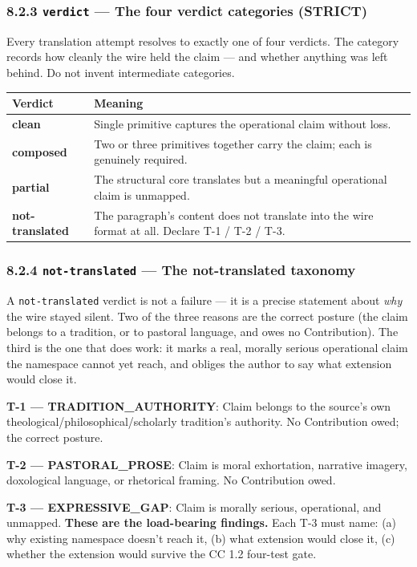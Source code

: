 \documentclass[11pt]{article}
\begin{document}
\subsubsection*{8.2.3 \texttt{verdict} — The four verdict categories (STRICT)}


Every translation attempt resolves to exactly one of four verdicts. The category records how cleanly the wire held the claim — and whether anything was left behind. Do not invent intermediate categories.


{\footnotesize
\begin{longtable}{|p{8.0cm}|p{8.0cm}|}\hline
\textbf{Verdict} & \textbf{Meaning} \\ \hline\endhead
\textbf{clean} & Single primitive captures the operational claim without loss. \\ \hline
\textbf{composed} & Two or three primitives together carry the claim; each is genuinely required. \\ \hline
\textbf{partial} & The structural core translates but a meaningful operational claim is unmapped. \\ \hline
\textbf{not-translated} & The paragraph's content does not translate into the wire format at all. Declare T-1 / T-2 / T-3. \\ \hline
\end{longtable}}


\subsubsection*{8.2.4 \texttt{not-translated} — The not-translated taxonomy}


A \texttt{not-translated} verdict is not a failure — it is a precise statement about \textit{why} the wire stayed silent. Two of the three reasons are the correct posture (the claim belongs to a tradition, or to pastoral language, and owes no Contribution). The third is the one that does work: it marks a real, morally serious operational claim the namespace cannot yet reach, and obliges the author to say what extension would close it.


\textbf{T-1 — TRADITION\_AUTHORITY}: Claim belongs to the source's own theological/philosophical/scholarly tradition's authority. No Contribution owed; the correct posture.


\textbf{T-2 — PASTORAL\_PROSE}: Claim is moral exhortation, narrative imagery, doxological language, or rhetorical framing. No Contribution owed.


\textbf{T-3 — EXPRESSIVE\_GAP}: Claim is morally serious, operational, and unmapped. \textbf{These are the load-bearing findings.} Each T-3 must name: (a) why existing namespace doesn't reach it, (b) what extension would close it, (c) whether the extension would survive the CC 1.2 four-test gate.
\end{document}
